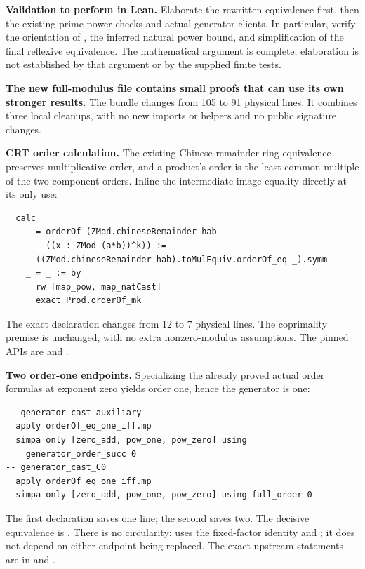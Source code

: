 \textbf{Validation to perform in Lean.} Elaborate the rewritten equivalence first, then the existing prime-power checks and actual-generator clients. In particular, verify the orientation of , the inferred natural power bound, and simplification of the final reflexive equivalence. The mathematical argument is complete; elaboration is not established by that argument or by the supplied finite tests.

\textbf{The new full-modulus file contains small proofs that can use its own stronger results.}
The bundle changes  from 105 to 91 physical lines. It combines three local cleanups, with no new imports or helpers and no public signature changes.

\textbf{CRT order calculation.} The existing Chinese remainder ring equivalence preserves multiplicative order, and a product's order is the least common multiple of the two component orders. Inline the intermediate image equality directly at its only use:
\begin{lstlisting}
  calc
    _ = orderOf (ZMod.chineseRemainder hab
        ((x : ZMod (a*b))^k)) :=
      ((ZMod.chineseRemainder hab).toMulEquiv.orderOf_eq _).symm
    _ = _ := by
      rw [map_pow, map_natCast]
      exact Prod.orderOf_mk
\end{lstlisting}
The exact declaration changes from 12 to 7 physical lines. The coprimality premise is unchanged, with no extra nonzero-modulus assumptions. The pinned APIs are  and .

\textbf{Two order-one endpoints.} Specializing the already proved actual order formulas at exponent zero yields order one, hence the generator is one:
\begin{lstlisting}
-- generator_cast_auxiliary
  apply orderOf_eq_one_iff.mp
  simpa only [zero_add, pow_one, pow_zero] using
    generator_order_succ 0
-- generator_cast_C0
  apply orderOf_eq_one_iff.mp
  simpa only [zero_add, pow_one, pow_zero] using full_order 0
\end{lstlisting}
The first declaration saves one line; the second saves two. The decisive equivalence is .
There is no circularity:  uses the fixed-factor identity and ; it does not depend on either endpoint being replaced. The exact upstream statements are in  and .

